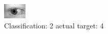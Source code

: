 \begin{figure}[h!]
\begin{center}
\includegraphics[width=0.60\columnwidth]{figures/ID807_class_2_target_4.png}
\end{center}
\caption{ Classification: 2 actual target: 4}
\label{fig:ID807_class_2_target_4}
\end{figure}
